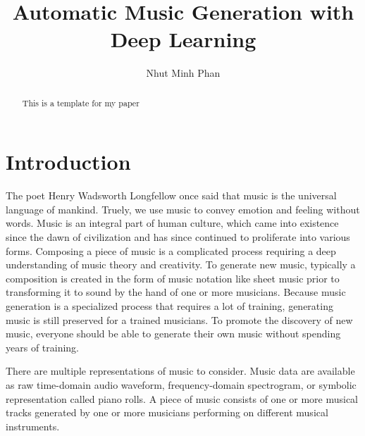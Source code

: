\documentclass[sigconf,authorversion]{acmart}
\begin{document}
\renewcommand\footnotetextcopyrightpermission[1]{}
\pagestyle{plain}
\title{Automatic Music Generation with Deep Learning}

\author{Nhut Minh Phan}

\begin{abstract}
This is a template for my paper


\end{abstract}


\maketitle

\section{Introduction}

The poet Henry Wadsworth Longfellow once said that music is the universal 
language of mankind. Truely, we use music to convey emotion and feeling without
words. Music is an integral part of human culture, which
came into existence since the dawn of civilization and has since continued to 
proliferate into various forms. Composing a piece of music is a complicated process 
requiring a deep understanding of music theory and creativity. To 
generate new music, typically a composition is created in the form of music notation 
like sheet music prior to transforming it to sound by the hand of one or more musicians.
Because music generation is a specialized process that requires a lot of training,
generating music is still preserved for a trained musicians. To promote the discovery of 
new music, everyone should be able to generate their own music without spending
years of training. 

There are multiple representations of music to consider. Music data are available
as raw time-domain audio waveform, frequency-domain spectrogram, or symbolic
representation called piano rolls. A piece of music consists of one or more musical
tracks generated by one or more musicians performing on different musical
instruments.
\end{document}
